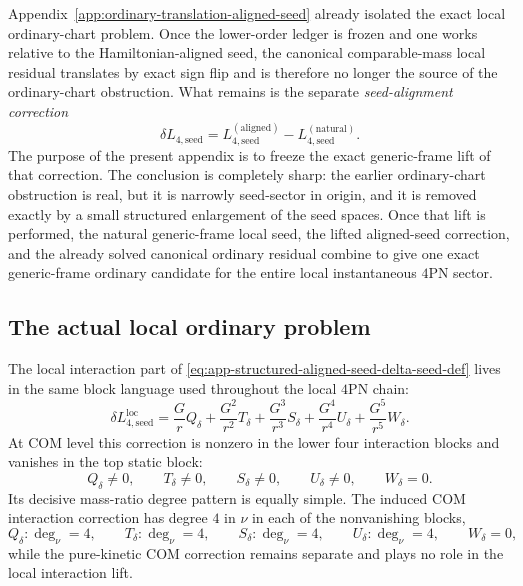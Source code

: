 \documentclass[11pt]{article}
\begin{document}
Appendix~\ref{app:ordinary-translation-aligned-seed} already isolated the
exact local ordinary-chart problem.  Once the lower-order ledger is frozen and
one works relative to the Hamiltonian-aligned seed, the canonical comparable-mass
local residual translates by exact sign flip and is therefore no longer the
source of the ordinary-chart obstruction.  What remains is the separate
\emph{seed-alignment correction}
\begin{equation}
\delta L_{4,\mathrm{seed}}
=
L_{4,\mathrm{seed}}^{(\mathrm{aligned})}
-
L_{4,\mathrm{seed}}^{(\mathrm{natural})}.
\label{eq:app-structured-aligned-seed-delta-seed-def}
\end{equation}
The purpose of the present appendix is to freeze the exact generic-frame lift of
that correction.  The conclusion is completely sharp: the earlier ordinary-chart
obstruction is real, but it is narrowly seed-sector in origin, and it is removed
exactly by a small structured enlargement of the seed spaces.  Once that lift is
performed, the natural generic-frame local seed, the lifted aligned-seed
correction, and the already solved canonical ordinary residual combine to give
one exact generic-frame ordinary candidate for the entire local instantaneous
$4$PN sector.

\subsection{The actual local ordinary problem}
\label{app:structured-aligned-seed-problem}

The local interaction part of
\eqref{eq:app-structured-aligned-seed-delta-seed-def} lives in the same block
language used throughout the local $4$PN chain:
\begin{equation}
\delta L_{4,\mathrm{seed}}^{\mathrm{loc}}
=
\frac{G}{r}Q_\delta
+
\frac{G^2}{r^2}T_\delta
+
\frac{G^3}{r^3}S_\delta
+
\frac{G^4}{r^4}U_\delta
+
\frac{G^5}{r^5}W_\delta.
\label{eq:app-structured-aligned-seed-block-decomposition}
\end{equation}
At COM level this correction is nonzero in the lower four interaction blocks and
vanishes in the top static block:
\begin{equation}
Q_\delta\neq 0,
\qquad
T_\delta\neq 0,
\qquad
S_\delta\neq 0,
\qquad
U_\delta\neq 0,
\qquad
W_\delta=0.
\label{eq:app-structured-aligned-seed-which-blocks}
\end{equation}
Its decisive mass-ratio degree pattern is equally simple.  The induced COM
interaction correction has degree $4$ in $\nu$ in each of the nonvanishing
blocks,
\begin{equation}
Q_\delta:\deg_\nu=4,
\qquad
T_\delta:\deg_\nu=4,
\qquad
S_\delta:\deg_\nu=4,
\qquad
U_\delta:\deg_\nu=4,
\qquad
W_\delta=0,
\label{eq:app-structured-aligned-seed-degree-pattern}
\end{equation}
while the pure-kinetic COM correction remains separate and plays no role in the
local interaction lift.
\end{document}
